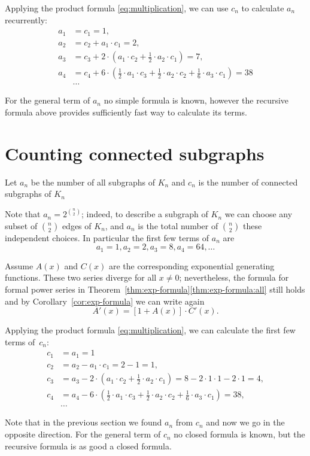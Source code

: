Applying the product formula \ref{eq:multiplication}, we can use $c_n$ to calculate $a_n$ recurrently:
\begin{align*}
a_1&=c_1=1,
\\
a_2&=c_2+a_1\cdot c_1=2,
\\
a_3&=c_3+2\cdot(a_1\cdot c_2+\tfrac12\cdot a_2\cdot c_1)=7,
\\
a_4&=c_4+6\cdot(\tfrac12\cdot a_1\cdot c_3+\tfrac12\cdot a_2\cdot c_2+\tfrac16\cdot a_3\cdot c_1)=38
\\
&\dots
\end{align*}

For the general term of $a_n$ no simple formula is known,
however the recursive formula above provides sufficiently fast way to calculate its terms.


\section*{Counting connected subgraphs}

Let $a_n$ be the number of all subgraphs of $K_n$ and $c_n$ is the number of connected subgraphs of $K_n$

Note that $a_n=2^{\binom n2}$;
indeed, to describe a subgraph of $K_n$ we can choose any subset of $\binom n2$ edges of $K_n$, and $a_n$ is the total number of $\binom n2$ these independent choices.
In particular the first few terms of $a_n$ are
\[a_1=1, a_2=2, a_3=8, a_4=64,\dots\]

Assume $A(x)$ and $C(x)$ are the corresponding exponential generating functions.
These two series diverge for all $x\ne 0$;
nevertheless, the formula for formal power series in Theorem~\ref{thm:exp-formula}\ref{thm:exp-formula:all}
still holds and by Corollary~\ref{cor:exp-formula} we can write again
\[A'(x)=[1+A(x)]\cdot C'(x).\]

Applying the product formula \ref{eq:multiplication}, we can calculate the first few terms of~$c_n$:
\begin{align*}
c_1&=a_1=1
\\
c_2&=a_2-a_1\cdot c_1=2-1=1,
\\
c_3&=a_3-2\cdot(a_1\cdot c_2+\tfrac12\cdot a_2\cdot c_1)=8-2\cdot1\cdot 1-2\cdot 1=4,
\\
c_4&=a_4-6\cdot(\tfrac12\cdot a_1\cdot c_3+\tfrac12\cdot a_2\cdot c_2+\tfrac16\cdot a_3\cdot c_1)=38,
\\
&\dots
\end{align*}

Note that in the previous section we found $a_n$ from $c_n$ and now we go in the opposite direction.
For the general term of $c_n$ no closed formula is known,
but the recursive formula is as good a closed formula.

